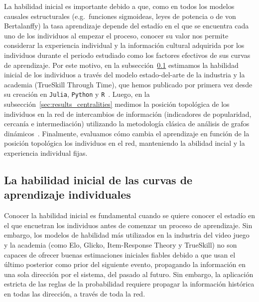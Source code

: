\documentclass[a4paper,11pt]{book}
\theoremstyle{definition}
\begin{document}
La habilidad inicial es importante debido a que, como en todos los modelos causales estructurales (e.g.~funciones sigmoideas, leyes de potencia o de von Bertalanffy) la tasa aprendizaje depende del estadío en el que se encuentra cada uno de los individuos al empezar el proceso, conocer su valor nos permite considerar la experiencia individual y la información cultural adquirida por los individuos durante el periodo estudiado como los factores efectivos de sus curvas de aprendizaje.
%
Por este motivo, en la subsección~\ref{sec:initial_ability} estimamos la habilidad inicial de los individuos a través del modelo estado-del-arte de la industria y la academia (TrueSkill Through Time), que hemos publicado por primera vez desde su creación en \texttt{Julia}, \texttt{Python} y \texttt{R}~\cite{Landfried2021-TTT}.
%
Luego, en la subsección~\ref{sec:results_centralities} medimos la posición topológica de los individuos en la red de intercambios de información (indicadores de popularidad, cercanía e intermediación) utilizando la metodología clásica de análisis de grafos dinámicos~\cite{Kossinets2006}.
%
%
%
%
Finalmente, evaluamos cómo cambia el aprendizaje en función de la posición topológica los individuos en el red, manteniendo la abilidad incial y la experiencia individual fijas.

\subsection{La habilidad inicial de las curvas de aprendizaje individuales}\label{sec:initial_ability}
Conocer la habilidad inicial es fundamental cuando se quiere conocer el estadío en el que encuetran los individuos antes de comenzar un proceso de aprendizaje.
%
Sin embargo, los modelos de habilidad más utilizados en la industria del video juego y la academia (como Elo, Glicko, Item-Response Theory y TrueSkill) no son capaces de ofrecer buenas estimaciones iniciales fiables debido a que usan el último posterior como prior del siguiente evento, propagando la información en una sola dirección por el sistema, del pasado al futuro.
%
Sin embargo, la aplicación estricta de las reglas de la probabilidad requiere propagar la información histórica en todas las dirección, a través de toda la red.
\end{document}
